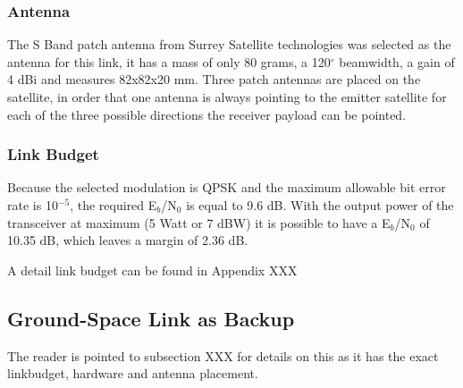 \subsubsection{Antenna}
The S Band patch antenna from Surrey Satellite technologies\cite{SurrPatch} was selected as the antenna for this link, it has a mass of only 80 grams, a 120$^{\circ}$ beamwidth, a gain of 4 dBi and measures 82x82x20 mm. Three patch antennas are placed on the satellite, in order that one antenna is always pointing to the emitter satellite for each of the three possible directions the receiver payload can be pointed.

\subsubsection{Link Budget}
Because the selected modulation is QPSK and the maximum allowable bit error rate is 10$^{-5}$, the required E$_{b}$/N$_{0}$ is equal to 9.6 dB. With the output power of the transceiver at maximum (5 Watt or 7 dBW) it is possible to have a E$_{b}$/N$_{0}$ of 10.35 dB, which leaves a margin of 2.36 dB.

A detail link budget can be found in Appendix XXX

\subsection{Ground-Space Link as Backup}
The reader is pointed to subsection XXX for details on this as it has the exact linkbudget, hardware and antenna placement. 

